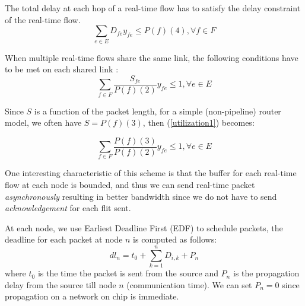 \documentclass[10pt]{article}
\begin{document}
The total delay at each hop of a real-time flow has to satisfy the delay constraint
of the real-time flow.
\begin{equation}\label{pathdelay1}
\sum_{e \in E}D_{fe}y_{fe} \leq P(f)(4), \forall f \in F
\end{equation}

When multiple real-time flows share the same link, the following conditions
 have to be met on each shared link \cite{Ferrari90ascheme, Verma_inproceedings}:
\begin{equation}\label{utilization1}
\sum_{f \in F}\frac{S_{fe}}{P(f)(2)}y_{fe} \leq 1, \forall e \in E
\end{equation}

Since $S$ is a function of the packet length, for a simple (non-pipeline) router
model, we often have $S=P(f)(3)$, then (\ref{utilization1}) becomes:

\begin{equation}\label{utilization2}
\sum_{f \in F}\frac{P(f)(3)}{P(f)(2)}y_{fe} \leq 1, \forall e \in E
\end{equation}

One interesting characteristic of this scheme is that the buffer for each 
real-time flow at each node is bounded, and thus we can send real-time packet 
{\em asynchronously} resulting in better bandwidth since we do not have to 
send {\em acknowledgement} for each flit sent.

At each node, we use Earliest Deadline First (EDF) \cite{Verma_inproceedings} 
to schedule packets, the deadline for each packet at node $n$ is computed as 
follows: 
\begin{equation}\label{deadline1}
dl_n=t_0 + \sum_{k=1}^{n}D_{i,k}+P_n
\end{equation}
where $t_0$ is the time the packet is sent from the source and $P_n$ is the propagation
delay from the source till node $n$ (communication time). We can set $P_n=0$ since
propagation on a network on chip is immediate.
\end{document}
